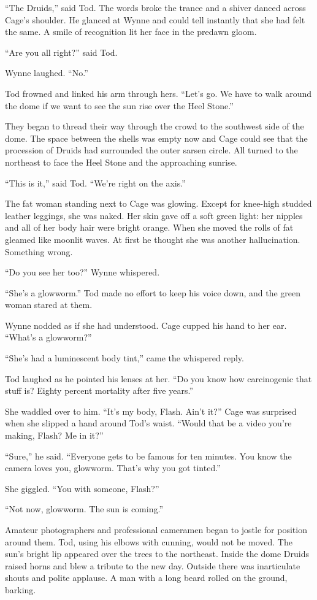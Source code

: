 “The Druids,” said Tod. The words broke the trance and a shiver danced across Cage’s shoulder. He glanced at Wynne and could tell instantly that she had felt the same. A smile of recognition lit her face in the predawn gloom.

“Are you all right?” said Tod.

Wynne laughed. “No.”

Tod frowned and linked his arm through hers. “Let’s go. We have to walk around the dome if we want to see the sun rise over the Heel Stone.”

They began to thread their way through the crowd to the southwest side of the dome. The space between the shells was empty now and Cage could see that the procession of Druids had surrounded the outer sarsen circle. All turned to the northeast to face the Heel Stone and the approaching sunrise.

“This is it,” said Tod. “We’re right on the axis.”

The fat woman standing next to Cage was glowing. Except for knee-high studded leather leggings, she was naked. Her skin gave off a soft green light: her nipples and all of her body hair were bright orange. When she moved the rolls of fat gleamed like moonlit waves. At first he thought she was another hallucination. Something wrong.

“Do you see her too?” Wynne whispered.

“She’s a glowworm.” Tod made no effort to keep his voice down, and the green woman stared at them.

Wynne nodded as if she had understood. Cage cupped his hand to her ear. “What’s a glowworm?”

“She’s had a luminescent body tint,” came the whispered reply.

Tod laughed as he pointed his lenses at her. “Do you know how carcinogenic that stuff is? Eighty percent mortality after five years.”

She waddled over to him. “It’s my body, Flash. Ain’t it?” Cage was surprised when she slipped a hand around Tod’s waist. “Would that be a video you’re making, Flash? Me in it?”

“Sure,” he said. “Everyone gets to be famous for ten minutes. You know the camera loves you, glowworm. That’s why you got tinted.”

She giggled. “You with someone, Flash?”

“Not now, glowworm. The sun is coming.”

Amateur photographers and professional cameramen began to jostle for position around them. Tod, using his elbows with cunning, would not be moved. The sun’s bright lip appeared over the trees to the northeast. Inside the dome Druids raised horns and blew a tribute to the new day. Outside there was inarticulate shouts and polite applause. A man with a long beard rolled on the ground, barking.

